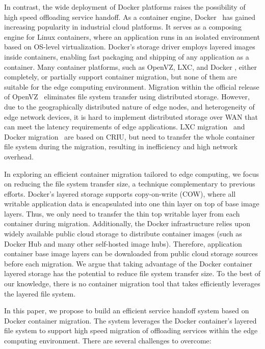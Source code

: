 In contrast, the wide deployment of Docker platforms raises the possibility of high speed offloading service handoff. As a container engine, Docker~\cite{docker}  has gained increasing popularity in industrial cloud platforms. It serves as a composing engine for Linux containers, where an application runs in an isolated environment based on OS-level virtualization.
Docker's storage driver employs layered images inside containers, enabling fast packaging and shipping of any application as a container. 
Many container platforms, such as OpenVZ\cite{openvz}, LXC\cite{qiu2016evaluating}, and Docker \cite{phaul,boucherPhaul}, either completely, or partially support container migration, but none of them are suitable for the edge computing environment. Migration within the official release of OpenVZ~\cite{phaul} eliminates file system transfer using distributed storage. However, due to the geographically distributed nature of edge nodes, and heterogeneity of edge network devices, it is hard to implement distributed storage over WAN that can meet the latency requirements of edge applications. 
LXC migration~\cite{qiu2016evaluating} and Docker migration~\cite{phaul, boucherPhaul} are based on CRIU\cite{criu}, but need to transfer the whole container file system during the migration, resulting in inefficiency and high network overhead.

In exploring an efficient container migration tailored to edge computing, we focus on reducing the file system transfer size, a technique complementary to previous efforts.
%
Docker's layered storage supports copy-on-write (COW), where all writable application data is encapsulated into one thin layer on top of base image layers.
Thus, we only need to transfer the thin top writable layer from each container during migration. Additionally, the Docker infrastructure relies upon widely available public cloud storage to distribute container images (such as Docker Hub\cite{dockerhub} and many other self-hosted image hubs). 
Therefore, application container base image layers can be downloaded from public cloud storage sources before each migration. We argue that taking advantage of the Docker container layered storage has the potential to reduce file system transfer size. To the best of our knowledge, there is no container migration tool that takes efficiently leverages the layered file system. 




In this paper, we propose to build an efficient service handoff system based on Docker container migration. The system leverages the Docker container's layered file system to support high speed migration of offloading services within the edge computing environment. 
There are several challenges to overcome:

